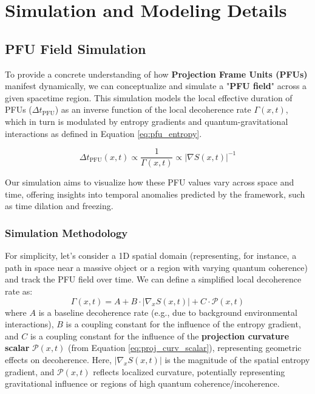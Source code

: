 \documentclass[12pt,a4paper]{article}
\numberwithin{equation}{section}
\begin{document}
\section{Simulation and Modeling Details}
\label{app:simulation}

\subsection{PFU Field Simulation}
To provide a concrete understanding of how \textbf{Projection Frame Units (PFUs)} manifest dynamically, we can conceptualize and simulate a "\textbf{PFU field}" across a given spacetime region. This simulation models the local effective duration of PFUs ($\Delta t_{\text{PFU}}$) as an inverse function of the local decoherence rate $\Gamma(x, t)$, which in turn is modulated by entropy gradients and quantum-gravitational interactions as defined in Equation \eqref{eq:pfu_entropy}.

\begin{equation}
\Delta t_{\text{PFU}}(x, t) \propto \frac{1}{\Gamma(x, t)} \propto \left|\nabla S(x, t)\right|^{-1}
\label{eq:pfu_field_model}
\end{equation}

Our simulation aims to visualize how these PFU values vary across space and time, offering insights into temporal anomalies predicted by the framework, such as time dilation and freezing.

\subsubsection{Simulation Methodology}
For simplicity, let's consider a 1D spatial domain (representing, for instance, a path in space near a massive object or a region with varying quantum coherence) and track the PFU field over time. We can define a simplified local decoherence rate as:
\begin{equation}
\Gamma(x, t) = A + B \cdot |\nabla_x S(x, t)| + C \cdot \mathcal{P}(x, t)
\end{equation}
where $A$ is a baseline decoherence rate (e.g., due to background environmental interactions), $B$ is a coupling constant for the influence of the entropy gradient, and $C$ is a coupling constant for the influence of the \textbf{projection curvature scalar} $\mathcal{P}(x, t)$ (from Equation \eqref{eq:proj_curv_scalar}), representing geometric effects on decoherence. Here, $|\nabla_x S(x, t)|$ is the magnitude of the spatial entropy gradient, and \textbf{$\mathcal{P}(x, t)$} reflects localized curvature, potentially representing gravitational influence or regions of high quantum coherence/incoherence.
\end{document}
